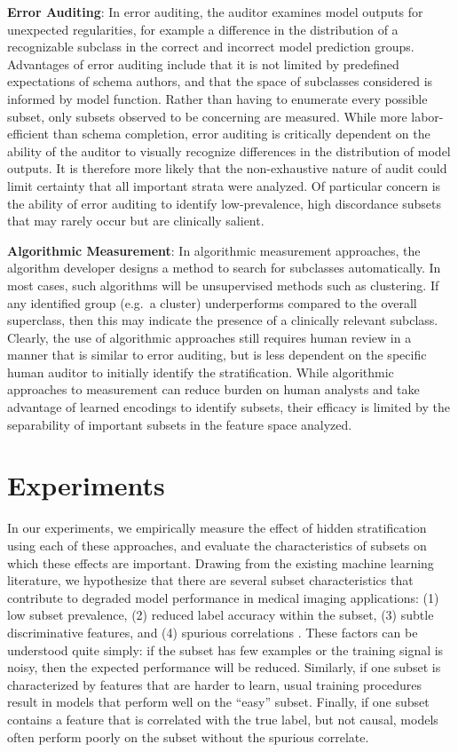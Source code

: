 \documentclass[sigconf]{acmart}
\begin{document}
\textbf{Error Auditing}: In error auditing, the auditor examines model outputs for unexpected regularities, for example a difference in the distribution of a recognizable subclass in the correct and incorrect model prediction groups. 
Advantages of error auditing include that it is not limited by predefined expectations of schema authors, and that the space of subclasses considered is informed by model function.
Rather than having to enumerate every possible subset, only subsets observed to be concerning are measured.
While more labor-efficient than schema completion, error auditing is critically dependent on the ability of the auditor to visually recognize differences in the distribution of model outputs.
It is therefore more likely that the non-exhaustive nature of audit could limit certainty that all important strata were analyzed.
Of particular concern is the ability of error auditing to identify low-prevalence, high discordance subsets that may rarely occur but are clinically salient.

\textbf{Algorithmic Measurement}: In algorithmic measurement approaches, the algorithm developer designs a method to search for subclasses automatically. 
In most cases, such algorithms will be unsupervised methods such as clustering. 
If any identified group (e.g.~a cluster) underperforms compared to the overall superclass, then this may indicate the presence of a clinically relevant subclass.
Clearly, the use of algorithmic approaches still requires human review in a manner that is similar to error auditing, but is less dependent on the specific human auditor to initially identify the stratification.  
While algorithmic approaches to measurement can reduce burden on human analysts and take advantage of learned encodings to identify subsets, their efficacy is limited by the separability of important subsets in the feature space analyzed.

\section{Experiments}
\label{sec:exps}

In our experiments, we empirically measure the effect of hidden stratification using each of these approaches, and evaluate the characteristics of subsets on which these effects are important.  
Drawing from the existing machine learning literature, we hypothesize that there are several subset characteristics that contribute to degraded model performance in medical imaging applications: (1) low subset prevalence, (2) reduced label accuracy within the subset, (3) subtle discriminative features, and (4) spurious correlations \citep{Selbst2017-gz}. 
These factors can be understood quite simply: if the subset has few examples or the training signal is noisy, then the expected performance will be reduced.  
Similarly, if one subset is characterized by features that are harder to learn, usual training procedures result in models that perform well on the ``easy'' subset.
Finally, if one subset contains a feature that is correlated with the true label, but not causal, models often perform poorly on the subset without the spurious correlate.
\end{document}
